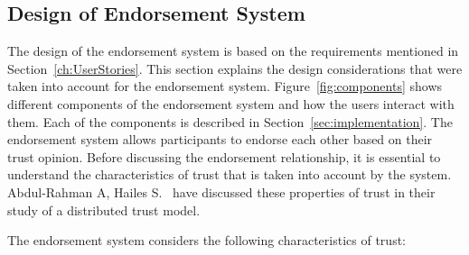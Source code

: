 \subsection{Design of Endorsement System}
The design of the endorsement system is based on the requirements mentioned in
Section~\ref{ch:UserStories}. This section explains the design considerations
that were taken into account for the endorsement system.
Figure~\ref{fig:components} shows different components of the endorsement
system and how the users interact with them. Each of the components is
described in Section~\ref{sec:implementation}. The endorsement system allows
participants to endorse each other based on their trust opinion. Before
discussing the endorsement relationship, it is essential to understand the
characteristics of trust that is taken into account by the system. Abdul-Rahman
A, Hailes S.~\cite{abdul1998distributed} have discussed these properties of
trust in their study of a distributed trust model. \par
The endorsement system considers the following characteristics of trust:
